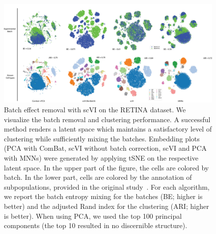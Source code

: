 \begin{figure}[htp]
\centering
\includegraphics[width=\textwidth]{figures/Figure-5}
\caption[Batch effect removal with scVI on the RETINA dataset]{Batch effect removal with scVI on the RETINA dataset. We visualize the batch removal and clustering performance. A successful method renders a latent space which maintains a satisfactory level of clustering while sufficiently mixing the batches. Embedding plots (PCA with ComBat, scVI without batch correction, scVI and PCA with MNNs) were generated by applying tSNE on the respective latent space. In the upper part of the figure, the cells are colored by batch. In the lower part, cells are colored by the annotation of subpopulations, provided in the original study~\cite{bipolar}. For each algorithm, we report the batch entropy mixing for the batches (BE; higher is better) and the adjusted Rand index for the clustering (ARI; higher is better). When using PCA, we used the top 100 principal components (the top 10 resulted in no discernible structure).}
\label{scvibatch_panel}
\end{figure}

